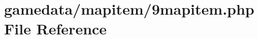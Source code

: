 \hypertarget{9mapitem_8php}{\section{gamedata/mapitem/9mapitem.php File Reference}
\label{9mapitem_8php}
}
